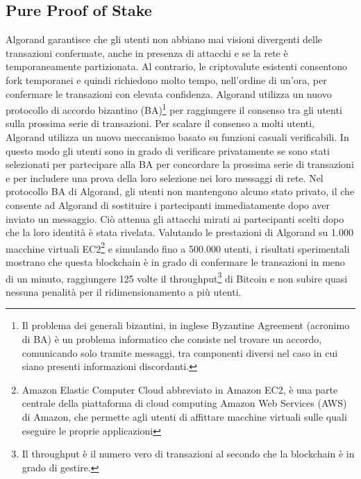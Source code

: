 \subsection{Pure Proof of Stake}
Algorand garantisce che gli utenti non abbiano mai visioni divergenti delle transazioni confermate, anche in presenza di attacchi e se la rete è temporaneamente partizionata. Al contrario, le criptovalute esistenti consentono fork temporanei e quindi richiedono molto tempo, nell'ordine di un'ora, per confermare le transazioni con elevata confidenza. Algorand utilizza un nuovo protocollo di accordo bizantino (BA)\footnote{Il problema dei generali bizantini, in inglese Byzantine Agreement (acronimo di BA) è un problema informatico che consiste nel trovare un accordo, comunicando solo tramite messaggi, tra componenti diversi nel caso in cui siano presenti informazioni discordanti.} per raggiungere il consenso tra gli utenti sulla prossima serie di transazioni. Per scalare il consenso a molti utenti, Algorand utilizza un nuovo meccanismo basato su funzioni casuali verificabili. In questo modo gli utenti sono in grado di verificare privatamente se sono stati selezionati per partecipare alla BA per concordare la prossima serie di transazioni e per includere una prova della loro selezione nei loro messaggi di rete. Nel protocollo BA di Algorand, gli utenti non mantengono alcuno stato privato, il che consente ad Algorand di sostituire i partecipanti immediatamente dopo aver inviato un messaggio. Ciò attenua gli attacchi mirati ai partecipanti scelti dopo che la loro identità è stata rivelata. Valutando le prestazioni di Algorand su 1.000 macchine virtuali EC2\footnote{Amazon Elastic Computer Cloud abbreviato in Amazon EC2, è una parte centrale della piattaforma di cloud computing Amazon Web Services (AWS) di Amazon, che permette agli utenti di affittare macchine virtuali sulle quali eseguire le proprie applicazioni} e simulando fino a 500.000 utenti, i risultati sperimentali mostrano che questa blockchain è in grado di confermare le transazioni in meno di un minuto, raggiungere 125 volte il throughput\footnote{Il throughput è il numero vero di transazioni al secondo che la blockchain è in grado di gestire.} di Bitcoin e non subire quasi nessuna penalità per il ridimensionamento a più utenti.

